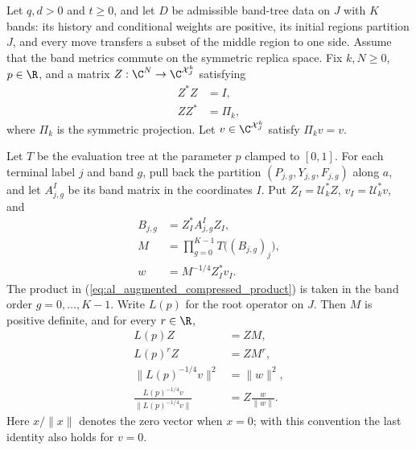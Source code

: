 \begin{lemma}
    \label{thm:al_augmented_root_compression}
    \leanok
    Let $q,d>0$ and $t\ge0$, and let $D$ be admissible band-tree data on $J$
    with $K$ bands: its history and conditional weights are positive, its
    initial regions partition $J$, and every move transfers a subset of the
    middle region to one side. Assume that the band metrics commute on the
    symmetric replica space. Fix $k,N\ge0$, $p\in\R$, and a
    matrix $Z:\C^N\to\C^{\mathcal X_J^k}$ satisfying
    \begin{align*}
        Z^*Z & =I,     \\
        ZZ^* & =\Pi_k,
    \end{align*}
    where $\Pi_k$ is the symmetric projection.
    Let $v\in\C^{\mathcal X_J^k}$ satisfy $\Pi_kv=v$.

    Let $T$ be the evaluation tree at the parameter $p$ clamped
    to $[0,1]$. For each terminal label $j$ and band $g$, pull
    back the partition $(P_{j,g},Y_{j,g},F_{j,g})$ along $a$,
    and let $A^I_{j,g}$ be its band matrix in the coordinates $I$.
    Put $Z_I=\mathcal U_k^*Z$, $v_I=\mathcal U_k^*v$, and
    \begin{align}
        B_{j,g} & =Z_I^*A^I_{j,g}Z_I,\nonumber                         \\
        M       & =\prod_{g=0}^{K-1}T\bigl((B_{j,g})_j\bigr),\nonumber \\
        w       & =M^{-1/4}Z_I^*v_I.
        \label{eq:al_augmented_compressed_product}
    \end{align}
    The product in (\ref{eq:al_augmented_compressed_product}) is taken in the
    band order $g=0,\ldots,K-1$. Write $L(p)$ for the root operator on $J$.
    Then $M$ is positive definite, and for every $r\in\R$,
    \begin{align}
        L(p)Z              & =ZM,\nonumber      \\
        L(p)^rZ            & =ZM^r,\nonumber    \\
        \|L(p)^{-1/4}v\|^2 & =\|w\|^2,\nonumber \\
        \frac{L(p)^{-1/4}v}{\|L(p)^{-1/4}v\|}
                           & =Z\frac{w}{\|w\|}.
        \label{eq:al_augmented_filtered_vector}
    \end{align}
    Here $x/\|x\|$ denotes the zero vector when $x=0$; with this convention
    the last identity also holds for $v=0$.
\end{lemma}
